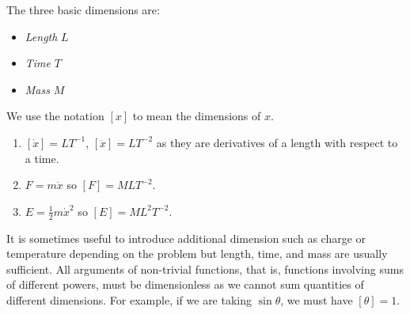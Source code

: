\documentclass[../main.tex]{subfiles}
\begin{document}
\begin{definition}
  The three basic dimensions are:
  \begin{itemize}
    \item \textit{Length} $L$
    \item \textit{Time} $T$
    \item \textit{Mass} $M$
  \end{itemize}
\end{definition}
\begin{remark}[Notation]
  We use the notation $[x]$ to mean the dimensions of $x$.
\end{remark}
\begin{example}
  \begin{enumerate}
    \item $[\dot{x}] = LT^{-1}$, $[\ddot{x}] = LT^{-2}$ as they are derivatives of a length with respect to a time.
    \item $F = m\ddot{x}$ so $[F] = MLT^{-2}$.
    \item $E = \frac{1}{2}m\dot{x}^2$ so $[E] = ML^2T^{-2}$.
  \end{enumerate}
\end{example}
It is sometimes useful to introduce additional dimension such as charge or temperature depending on the problem but length, time, and mass are usually sufficient.
All arguments of non-trivial functions, that is, functions involving sums of different powers, must be dimensionless as we cannot sum quantities of different dimensions.
For example, if we are taking $\sin \theta$, we must have $[\theta] = 1$.
\end{document}
